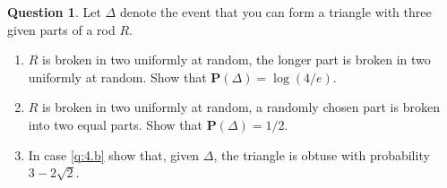 \documentclass[utf8]{article}
\theoremstyle{definition}%
\newtheorem{question}{Question} %
\theoremstyle{plain}%
\begin{document}
\begin{question}
    Let $\Delta$ denote the event that you can form a triangle with three given parts of a rod $R$.
    \begin{enumerate}[label=(\alph*)]
        \item $R$ is broken in two uniformly at random, the longer part is broken in two uniformly at random. Show that $\mathbf{P}(\Delta) = \log(4/e)$.
        \item \label{q:4.b} $R$ is broken in two uniformly at random, a randomly chosen part is broken into two equal parts. Show that $\mathbf{P}(\Delta) = 1/2$.
        \item In case \ref{q:4.b} show that, given $\Delta$, the triangle is obtuse with probability $3 - 2\sqrt{2}$.
    \end{enumerate}
\end{question}
\end{document}
